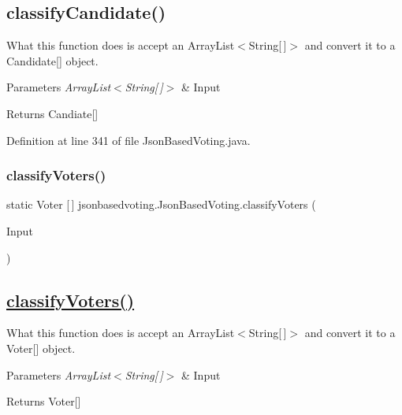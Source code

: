 \subsection*{classify\+Candidate() }

What this function does is accept an Array\+List$<$\+String\mbox{[}$\,$\mbox{]}$>$ and convert it to a Candidate\mbox{[}\mbox{]} object. 
\begin{DoxyParams}{Parameters}
{\em Array\+List$<$\+String\mbox{[}$\,$\mbox{]}$>$} & Input \\
\hline
\end{DoxyParams}
\begin{DoxyReturn}{Returns}
Candiate\mbox{[}\mbox{]} 
\end{DoxyReturn}


Definition at line 341 of file Json\+Based\+Voting.\+java.

\mbox{\label{classjsonbasedvoting_1_1_json_based_voting_a6f76956192c5ec8d7704c20bcc967d91}} 
\subsubsection{\texorpdfstring{classifyVoters()}{classifyVoters()}}
{\footnotesize\ttfamily static Voter \mbox{[}$\,$\mbox{]} jsonbasedvoting.\+Json\+Based\+Voting.\+classify\+Voters (\begin{DoxyParamCaption}\item[{Array\+List$<$ String\mbox{[}$\,$\mbox{]}$>$}]{Input }\end{DoxyParamCaption})\hspace{0.3cm}{\ttfamily [static]}}

\subsection*{\mbox{\hyperlink{classjsonbasedvoting_1_1_json_based_voting_a6f76956192c5ec8d7704c20bcc967d91}{classify\+Voters()}} }

What this function does is accept an Array\+List$<$\+String\mbox{[}$\,$\mbox{]}$>$ and convert it to a Voter\mbox{[}\mbox{]} object. 
\begin{DoxyParams}{Parameters}
{\em Array\+List$<$\+String\mbox{[}$\,$\mbox{]}$>$} & Input \\
\hline
\end{DoxyParams}
\begin{DoxyReturn}{Returns}
Voter\mbox{[}\mbox{]} 
\end{DoxyReturn}


